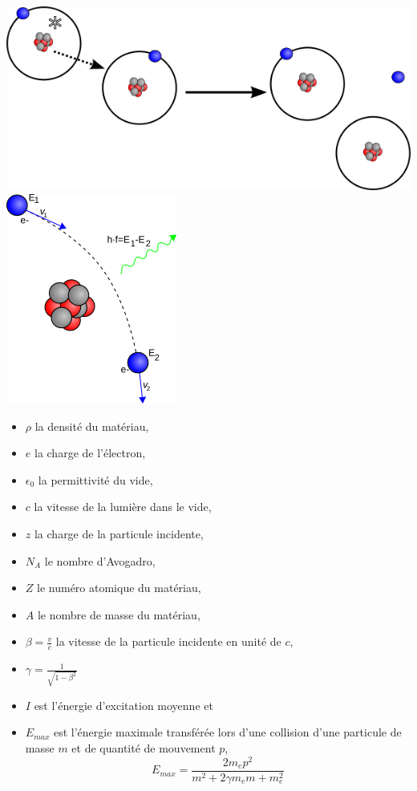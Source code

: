 \marginpar
{
	\centering
	\includegraphics[width=\marginparwidth]{RPC/Penning.png}
	\label{Penning}
}
\marginpar
{
	\centering
	\includegraphics[width=\marginparwidth]{RPC/Brem.png}
	\label{Brem}
}

\begin{itemize}[label=$\bullet$]
	\item $\rho$ la densité du matériau,
	\item $e$ la charge de l'électron,
	\item $\epsilon_{0}$ la permittivité du vide,
	\item $c$ la vitesse de la lumière dans le vide,
	\item $z$ la charge de la particule incidente,
	\item $N_{A}$ le nombre d'Avogadro,
	\item $Z$ le numéro atomique du matériau,
	\item $A$ le nombre de masse du matériau,
	\item $\beta=\frac{v}{c}$ la vitesse de la particule incidente en unité de $c$,
	\item $\gamma=\frac{1}{\sqrt{1-\beta^{2}}}$
	\item $I$ est l'énergie d'excitation moyenne et
	\item $E_{max}$ est l'énergie maximale transférée lors d'une collision d'une particule de masse $m$ et de quantité de mouvement $p$,
	\begin{equation}
	E_{max}=\frac{2m_{e}p^{2}}{m^2+2\gamma m_{e}m+m_{e}^2}
	\end{equation}
\end{itemize}

